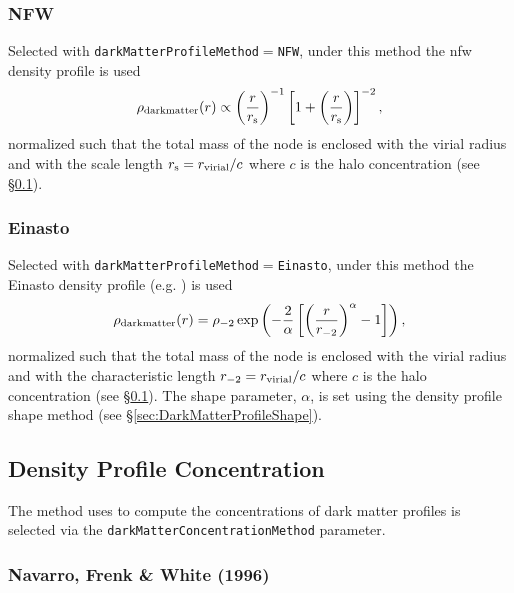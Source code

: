 \subsubsection{NFW}

Selected with {\tt darkMatterProfileMethod}$=${\tt NFW}, under this method the \gls{nfw} density profile \citep{navarro_universal_1997} is used
\begin{equation}
  \rho_{\rm dark matter}(r) \propto \left({r\over r_{\rm s}}\right)^{-1} \left[1 + \left({r\over r_{\rm s}}\right) \right]^{-2},
\end{equation}
normalized such that the total mass of the \gls{node} is enclosed with the virial radius and with the scale length $r_{\rm s} = r_{\rm virial}/c$ where $c$ is the halo concentration (see \S\ref{sec:DarkMatterProfileConcentration}).

\subsubsection{Einasto}

Selected with {\tt darkMatterProfileMethod}$=${\tt Einasto}, under this method the Einasto density profile (e.g. \citealt{cardone_spherical_2005}) is used
\begin{equation}
  \rho_{\rm dark matter}(r) = \rho_{-2} \exp \left( - {2 \over \alpha} \left[ \left( {r \over r_{-2}} \right)^\alpha - 1 \right] \right),
\end{equation}
normalized such that the total mass of the \gls{node} is enclosed with the virial radius and with the characteristic length $r_{-2} = r_{\rm virial}/c$ where $c$ is the halo concentration (see \S\ref{sec:DarkMatterProfileConcentration}). The shape parameter, $\alpha$, is set using the density profile shape method (see \S\ref{sec:DarkMatterProfileShape}).

\subsection{Density Profile Concentration}\label{sec:DarkMatterProfileConcentration}

The method uses to compute the concentrations of dark matter profiles is selected via the {\tt darkMatterConcentrationMethod} parameter.

\subsubsection{Navarro, Frenk \& White (1996)}


